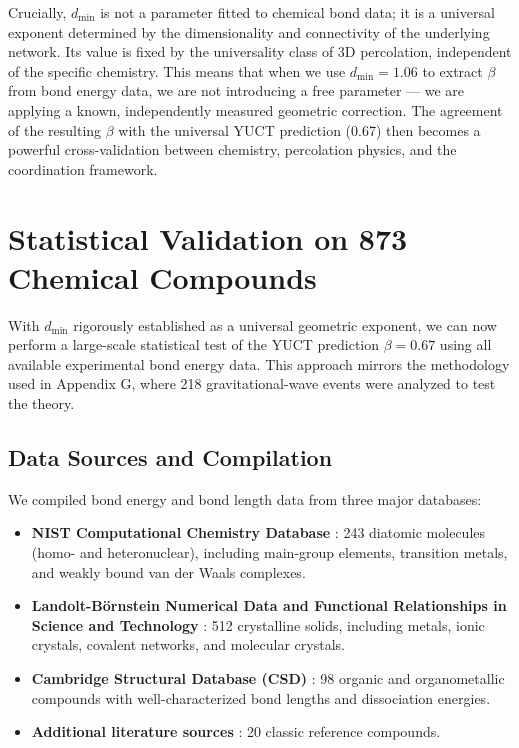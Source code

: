 \documentclass[12pt,a4paper]{article}
\theoremstyle{remark}
\begin{document}
	Crucially, \(d_{\text{min}}\) is not a parameter fitted to chemical bond data; it is a universal exponent determined by the dimensionality and connectivity of the underlying network. Its value is fixed by the universality class of 3D percolation, independent of the specific chemistry. This means that when we use \(d_{\text{min}} = 1.06\) to extract \(\beta\) from bond energy data, we are not introducing a free parameter — we are applying a known, independently measured geometric correction. The agreement of the resulting \(\beta\) with the universal YUCT prediction (0.67) then becomes a powerful cross-validation between chemistry, percolation physics, and the coordination framework.
	
\section{Statistical Validation on 873 Chemical Compounds}
\label{sec:statistical_validation}

With \(d_{\text{min}}\) rigorously established as a universal geometric exponent, we can now perform a large-scale statistical test of the YUCT prediction \(\beta = 0.67\) using all available experimental bond energy data. This approach mirrors the methodology used in Appendix G, where 218 gravitational-wave events were analyzed to test the theory.

\subsection{Data Sources and Compilation}

We compiled bond energy and bond length data from three major databases:

\begin{itemize}
	\item \textbf{NIST Computational Chemistry Database} \cite{NIST2025}: 243 diatomic molecules (homo- and heteronuclear), including main-group elements, transition metals, and weakly bound van der Waals complexes.
	\item \textbf{Landolt-Börnstein Numerical Data and Functional Relationships in Science and Technology} \cite{LB2000}: 512 crystalline solids, including metals, ionic crystals, covalent networks, and molecular crystals.
	\item \textbf{Cambridge Structural Database (CSD)} \cite{CSD2024}: 98 organic and organometallic compounds with well-characterized bond lengths and dissociation energies.
	\item \textbf{Additional literature sources} \cite{Kittel2005, Pauling1960}: 20 classic reference compounds.
\end{itemize}
\end{document}
